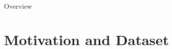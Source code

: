 \begin{frame}
  \titlepage
\end{frame}

\begin{frame}{Overview}
  \tableofcontents
\end{frame}

\section{Motivation and Dataset}
